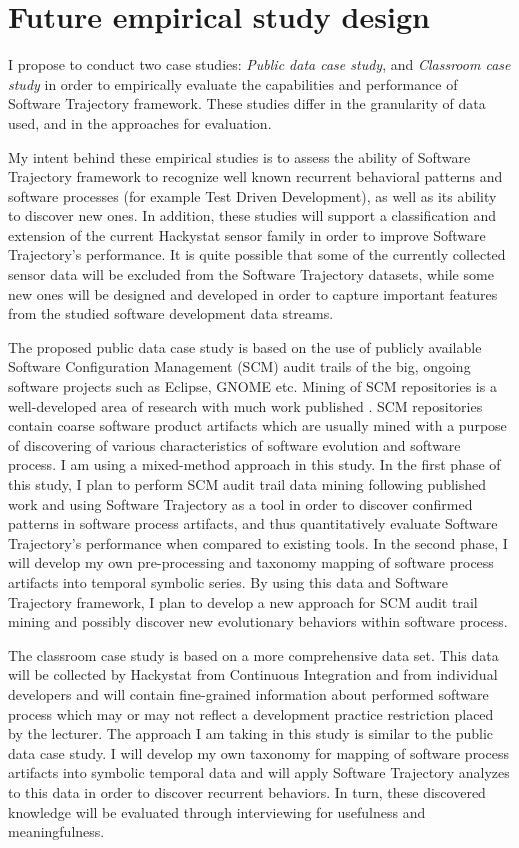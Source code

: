 \documentclass{sig-alternate}
\begin{document}
\section{Future empirical study design}
I propose to conduct two case studies: \textit{Public data case study}, and \textit{Classroom case study} in order to empirically evaluate the capabilities and performance of Software Trajectory framework. These studies differ in the granularity of data used, and in the approaches for evaluation. 

My intent behind these empirical studies is to assess the ability of Software Trajectory framework to recognize well known recurrent behavioral patterns and software processes (for example Test Driven Development), as well as its ability to discover new ones. In addition, these studies will support a classification and extension of the current Hackystat sensor family in order to improve Software Trajectory's performance. It is quite possible that some of the currently collected sensor data will be excluded from the Software Trajectory datasets, while some new ones will be designed and developed in order to capture important features from the studied software development data streams. 

The proposed public data case study is based on the use of publicly available Software Configuration Management (SCM) audit trails of the big, ongoing software projects such as Eclipse, GNOME etc. Mining of SCM repositories is a well-developed area of research with much work published \cite{citeulike:5043676}. SCM repositories contain coarse software product artifacts which are usually mined with a purpose of discovering of various characteristics of software evolution and software process. I am using a mixed-method approach in this study. In the first phase of this study, I plan to perform SCM audit trail data mining following published work and using Software Trajectory as a tool in order to discover confirmed patterns in software process artifacts, and thus quantitatively evaluate Software Trajectory's performance when compared to existing tools. In the second phase, I will develop my own pre-processing and taxonomy mapping of software process artifacts into temporal symbolic series. By using this data and Software Trajectory framework, I plan to develop a new approach for SCM audit trail mining and possibly discover new evolutionary behaviors within software process. 

The classroom case study is based on a more comprehensive data set. This data will be collected by Hackystat from Continuous Integration and from individual developers and will contain fine-grained information about performed software process which may or may not reflect a development practice restriction placed by the lecturer. The approach I am taking in this study is similar to the public data case study. I will develop my own taxonomy for mapping of software process artifacts into symbolic temporal data and will apply Software Trajectory analyzes to this data in order to discover recurrent behaviors. In turn, these discovered knowledge will be evaluated through interviewing for usefulness and meaningfulness. 
\end{document}
